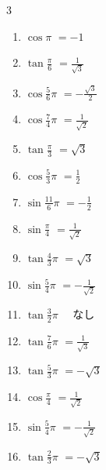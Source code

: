 \begin{multicols}{3}
\begin{enumerate}
  \item $\displaystyle \cos{\pi}$
        $\displaystyle =-1$

  \item $\displaystyle \tan{\frac{\pi}{6}}$
        $\displaystyle =\frac{1}{\sqrt{3}}$

  \item $\displaystyle \cos{\frac{5}{6}\pi}$
        $\displaystyle =-\frac{\sqrt{3}}{2}$

  \item $\displaystyle \cos{\frac{7}{4}\pi}$
        $\displaystyle =\frac{1}{\sqrt{2}}$

  \item $\displaystyle \tan{\frac{\pi}{3}}$
        $\displaystyle =\sqrt{3}$

  \item $\displaystyle \cos{\frac{5}{3}\pi}$
        $\displaystyle =\frac{1}{2}$

  \item $\displaystyle \sin{\frac{11}{6}\pi}$
        $\displaystyle =-\frac{1}{2}$

  \item $\displaystyle \sin{\frac{\pi}{4}}$
        $\displaystyle =\frac{1}{\sqrt{2}}$

  \item $\displaystyle \tan{\frac{4}{3}\pi}$
        $\displaystyle =\sqrt{3}$

  \item $\displaystyle \sin{\frac{5}{4}\pi}$
        $\displaystyle =-\frac{1}{\sqrt{2}}$

  \item $\displaystyle \tan{\frac{3}{2}\pi}$
        $\displaystyle \quad なし$

  \item $\displaystyle \tan{\frac{7}{6}\pi}$
        $\displaystyle =\frac{1}{\sqrt{3}}$

  \item $\displaystyle \tan{\frac{5}{3}\pi}$
        $\displaystyle =-\sqrt{3}$

  \item $\displaystyle \cos{\frac{\pi}{4}}$
        $\displaystyle =\frac{1}{\sqrt{2}}$

  \item $\displaystyle \sin{\frac{5}{4}\pi}$
        $\displaystyle =-\frac{1}{\sqrt{2}}$

  \item $\displaystyle \tan{\frac{2}{3}\pi}$
        $\displaystyle =-\sqrt{3}$


\end{enumerate}
\end{multicols}
